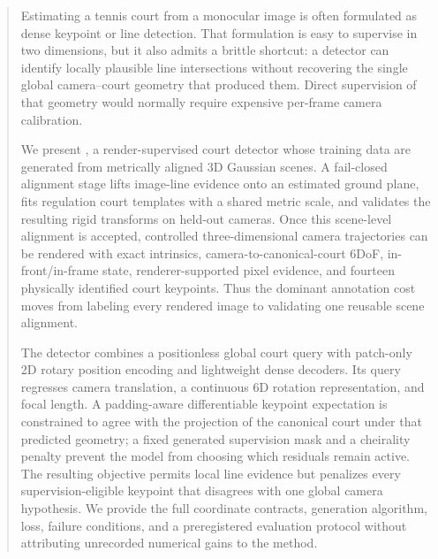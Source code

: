 \begin{abstract}
Estimating a tennis court from a monocular image is often formulated as dense
keypoint or line detection.  That formulation is easy to supervise in two
dimensions, but it also admits a brittle shortcut: a detector can identify
locally plausible line intersections without recovering the single global
camera--court geometry that produced them.  Direct supervision of that geometry
would normally require expensive per-frame camera calibration.

We present \Method, a render-supervised court detector whose training data are
generated from metrically aligned 3D Gaussian scenes.  A fail-closed alignment
stage lifts image-line evidence onto an estimated ground plane, fits regulation
court templates with a shared metric scale, and validates the resulting rigid
transforms on held-out cameras.  Once this scene-level alignment is accepted,
controlled three-dimensional camera trajectories can be rendered with exact
intrinsics, camera-to-canonical-court 6DoF, in-front/in-frame state,
renderer-supported pixel evidence, and fourteen physically identified court
keypoints.  Thus the dominant annotation cost moves from
labeling every rendered image to validating one reusable scene alignment.

The detector combines a positionless global court query with patch-only 2D
rotary position encoding and lightweight dense decoders.  Its query regresses
camera translation, a continuous 6D rotation representation, and focal length.
A padding-aware differentiable keypoint expectation is constrained to agree
with the projection of the canonical court under that predicted geometry;
a fixed generated supervision mask and a cheirality penalty prevent the model
from choosing which residuals remain active.  The resulting objective permits
local line evidence but penalizes every supervision-eligible keypoint that
disagrees with one global camera hypothesis.  We provide the full coordinate
contracts, generation
algorithm, loss, failure conditions, and a preregistered evaluation protocol
without attributing unrecorded numerical gains to the method.
\end{abstract}
